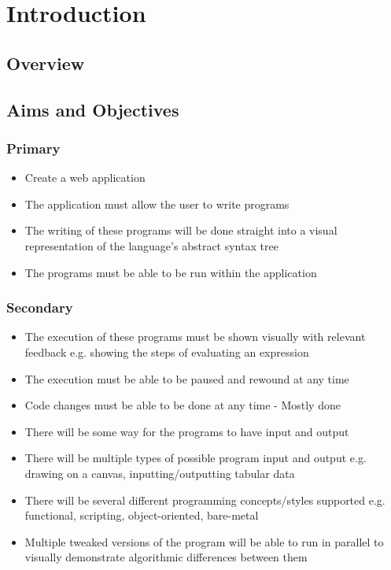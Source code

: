 \chapter{Introduction}

\section{Overview}

\section{Aims and Objectives}
\subsection{Primary}

\begin{itemize}
\item Create a web application
\item The application must allow the user to write programs
\item The writing of these programs will be done straight into a visual representation of the language's abstract syntax tree
\item The programs must be able to be run within the application
\end{itemize}

\subsection{Secondary}

\begin{itemize}
\item The execution of these programs must be shown visually with relevant feedback
\subitem e.g. showing the steps of evaluating an expression
\item The execution must be able to be paused and rewound at any time
\item Code changes must be able to be done at any time - Mostly done
\item There will be some way for the programs to have input and output
\item There will be multiple types of possible program input and output
\subitem e.g. drawing on a canvas, inputting/outputting tabular data
\item There will be several different programming concepts/styles supported
\subitem e.g. functional, scripting, object-oriented, bare-metal
\item Multiple tweaked versions of the program will be able to run in parallel to visually demonstrate algorithmic differences between them
\end{itemize}
